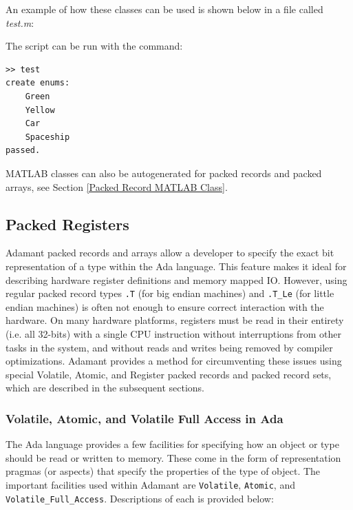 An example of how these classes can be used is shown below in a file called \textit{test.m}:


The script can be run with the command:

\vspace{5mm} %
\begin{verbatim}
>> test
create enums:
    Green
    Yellow
    Car
    Spaceship
passed.
\end{verbatim}
\vspace{5mm} %

MATLAB classes can also be autogenerated for packed records and packed arrays, see Section \ref{Packed Record MATLAB Class}.

\subsection{Packed Registers}

Adamant packed records and arrays allow a developer to specify the exact bit representation of a type within the Ada language. This feature makes it ideal for describing hardware register definitions and memory mapped IO. However, using regular packed record types \texttt{.T} (for big endian machines) and \texttt{.T\_Le} (for little endian machines) is often not enough to ensure correct interaction with the hardware. On many hardware platforms, registers must be read in their entirety (i.e. all 32-bits) with a single CPU instruction without interruptions from other tasks in the system, and without reads and writes being removed by compiler optimizations. Adamant provides a method for circumventing these issues using special Volatile, Atomic, and Register packed records and packed record sets, which are described in the subsequent sections.

\subsubsection{Volatile, Atomic, and Volatile Full Access in Ada}

The Ada language provides a few facilities for specifying how an object or type should be read or written to memory. These come in the form of representation pragmas (or aspects) that specify the properties of the type of object. The important facilities used within Adamant are \texttt{Volatile}, \texttt{Atomic}, and \texttt{Volatile\_Full\_Access}. Descriptions of each is provided below:

